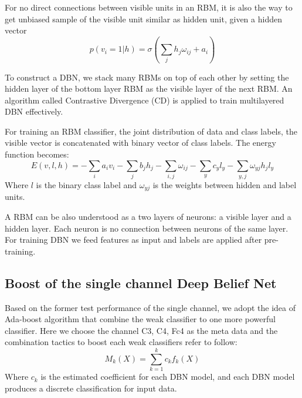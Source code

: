 \documentclass{llncs}
\begin{document}
For no direct connections between visible units in an RBM, it is also the way to get unbiased sample of the visible unit similar as hidden unit, given a hidden vector
\begin{equation}
 p(v_i=1|h)=\sigma(\sum_{j}h_j\omega_{ij}+a_i)
\end{equation}

                                          
To construct a DBN, we stack many RBMs on top of each other by setting the hidden layer of the bottom layer RBM as the visible layer of the next RBM. An algorithm called Contrastive Divergence (CD) is applied to train multilayered DBN effectively\cite{5}.


For training an RBM classifier, the joint distribution of data and class labels, the visible vector is concatenated with binary vector of class labels. The energy function becomes:
\begin{equation}
 E(v,l,h)=-\sum_i a_iv_i - \sum_j b_jh_j - \sum_{i,j} \omega_{ij} - \sum_y c_yl_y -\sum_{y,j} \omega_{yj}h_jl_y
\end{equation}
Where $l$ is the binary class label and $\omega_{yj}$ is the weights between hidden and label units.


A RBM can be also understood as a two layers of neurons: a visible layer and a hidden layer. Each neuron is no connection between neurons of the same layer. For training DBN we feed features as input and labels are applied after pre-training.


\subsection{Boost of the single channel Deep Belief Net}
Based on the former test performance of the single channel, we adopt the idea of Ada-boost algorithm\cite{8} that combine the weak classifier to one more powerful classifier\cite{19}\cite{20}. Here we choose the channel C3, C4, Fc4 as the meta data and the combination tactics to boost each weak classifiers refer to follow\cite{15}\cite{16}:
\begin{equation}
M_k(X)=\sum_{k=1}^{k} c_kf_k(X)
\end{equation}                                                                           
Where $c_k$ is the estimated coefficient for each DBN model, and each DBN model produces a discrete classification for input data\cite{17}.
\end{document}
